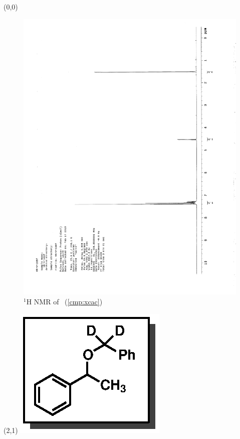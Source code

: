 \begin{textblock}{20}(0,0)
\begin{figure}[htb]
\caption{$^1$H NMR of \CMPxcac\ (\ref{cmp:xcac})}
\includegraphics[scale=0.75, trim = 0mm 0mm 0mm 5mm,
clip]{chp_alkylation/images/nmr/xcacH}
\vspace{-100pt}
\end{figure}
\end{textblock}
\begin{textblock}{1}(2,1)
\includegraphics[scale=0.8, angle=90]{chp_alkylation/images/xcac}
\end{textblock}

